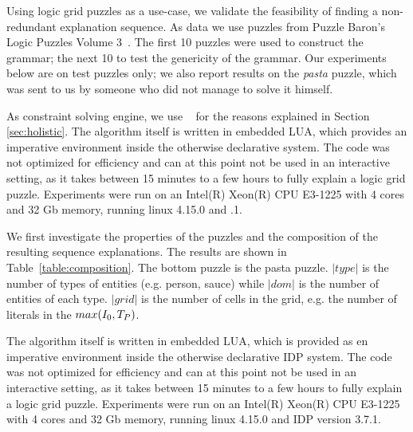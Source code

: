 Using logic grid puzzles as a use-case, we validate the feasibility of finding a non-redundant explanation sequence.
% 
As data we use puzzles from Puzzle Baron’s Logic Puzzles Volume 3~\cite{logigrammen}. The first 10 puzzles were used to construct the grammar; the next 10 to test the genericity of the grammar. 
Our experiments below are on test puzzles only; we also report results on the \textit{pasta} puzzle, which was sent to us by someone who did not manage to solve it himself.

As constraint solving engine, we use \idp~\cite{IDP} for the reasons explained in Section \ref{sec:holistic}. %
% 
The algorithm itself is written in embedded LUA, which provides an imperative environment inside the otherwise declarative \idp system. The code was not optimized for efficiency and can at this point not be used in an interactive setting, as it takes between 15 minutes to a few hours to fully explain a logic grid puzzle. Experiments were run on an Intel(R) Xeon(R) CPU E3-1225 with 4 cores and 32 Gb memory, running linux 4.15.0 and .1.

We first investigate the properties of the puzzles and the composition of the resulting sequence explanations. The results are shown in Table~\ref{table:composition}. The bottom puzzle is the pasta puzzle. $|type|$ is the number of types of entities (e.g. person, sauce) while $|dom|$ is the number of entities of each type. $|grid|$ is the number of cells in the grid, e.g. the number of literals in the $max(I_0,T_P)$.

The algorithm itself is written in embedded LUA, which is provided as en imperative environment inside the otherwise declarative IDP system. The code was not optimized for efficiency and can at this point not be used in an interactive setting, as it takes between 15 minutes to a few hours to fully explain a logic grid puzzle. Experiments were run on an Intel(R) Xeon(R) CPU E3-1225 with 4 cores and 32 Gb memory, running linux 4.15.0 and IDP version 3.7.1.

